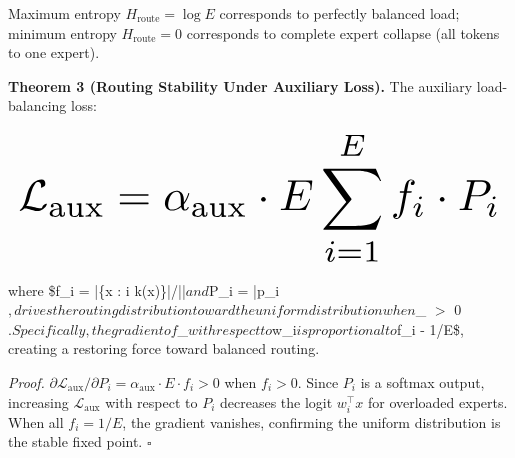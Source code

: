 \documentclass[10pt,journal,compsoc,twocolumn]{IEEEtran}
\begin{document}
Maximum entropy $H_{\text{route}} = \log E$ corresponds to perfectly balanced load; minimum entropy $H_{\text{route}} = 0$ corresponds to complete expert collapse (all tokens to one expert).

\textbf{Theorem 3 (Routing Stability Under Auxiliary Loss).} The auxiliary load-balancing loss:



























\begin{equation}
\resizebox{\columnwidth}{!}{$\displaystyle
\begin{aligned}
\mathcal{L}_{\text{aux}} = \alpha_{\text{aux}} \cdot E \sum_{i=1}^E f_i \cdot P_i
\end{aligned}
$}
\end{equation}



























where \$f\_i = |\{x \in {} : i \in {}k(x)\}|/||$ and $P\_i = \bar{p}\_i$, drives the routing distribution toward the uniform distribution when $\alpha\_{} $>$ 0$. Specifically, the gradient of $\_{}$ with respect to $w\_i$ is proportional to $f\_i - 1/E\$, creating a restoring force toward balanced routing.

\textit{Proof.} $\partial \mathcal{L}_{\text{aux}}/\partial P_i = \alpha_{\text{aux}} \cdot E \cdot f_i > 0$ when $f_i > 0$. Since $P_i$ is a softmax output, increasing $\mathcal{L}_{\text{aux}}$ with respect to $P_i$ decreases the logit $w_i^\top x$ for overloaded experts. When all $f_i = 1/E$, the gradient vanishes, confirming the uniform distribution is the stable fixed point. $\square$
\end{document}
